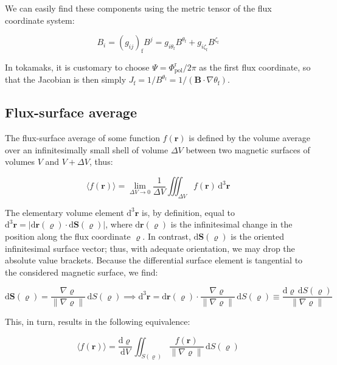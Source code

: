 We can easily find these components using the metric tensor of the flux coordinate system:

\begin{equation}
    B_i=(g_{ij})_\text{f}B^j=g_{i\theta_\text{f}}B^{\theta_\text{f}}+g_{i\zeta_\text{f}}B^{\zeta_\text{f}}
\end{equation}

In tokamaks, it is customary to choose $\Psi=\Phi_\text{pol}^\text{r}/2\pi$ as the first flux coordinate, so that the Jacobian is then simply $J_\text{f}=1/B^{\theta_\text{f}}=1/(\mathbf{B}\cdot\nabla\theta_\text{f})$.

\subsection{Flux-surface average}

The flux-surface average of some function $f(\mathbf{r})$ is defined by the volume average over an infinitesimally small shell of volume $\Delta V$ between two magnetic surfaces of volumes $V$ and $V+\Delta V$, thus:

\begin{equation}
    \label{eq-6-x-x}
    \langle f(\mathbf{r})\rangle=\lim_{\Delta V\to0}\frac{1}{\Delta V}\iiint_{\Delta V}f(\mathbf{r})\,\mathrm{d}^3\mathbf{r}
\end{equation}

The elementary volume element $\mathrm{d}^3\mathbf{r}$ is, by definition, equal to $\mathrm{d}^3\mathbf{r}=|\mathrm{d}\mathbf{r}(\varrho)\cdot\mathrm{d}\mathbf{S}(\varrho)|$, where $\mathrm{d}\mathbf{r}(\varrho)$ is the infinitesimal change in the position along the flux coordinate $\varrho$. In contrast, $\mathrm{d}\mathbf{S}(\varrho)$ is the oriented infinitesimal surface vector; thus, with adequate orientation, we may drop the absolute value brackets. Because the differential surface element is tangential to the considered magnetic surface, we find:

\begin{equation}
    \mathrm{d}\mathbf{S}(\varrho)=\frac{\nabla\varrho}{\|\nabla\varrho\|}\,\mathrm{d}S(\varrho)\implies\mathrm{d}^3\mathbf{r}=\mathrm{d}\mathbf{r}(\varrho)\cdot\frac{\nabla\varrho}{\|\nabla\varrho\|}\,\mathrm{d}S(\varrho)\equiv\frac{\mathrm{d}\varrho\,\mathrm{d}S(\varrho)}{\|\nabla\varrho\|}
\end{equation}

This, in turn, results in the following equivalence:

\begin{equation}
    \langle f(\mathbf{r})\rangle=\frac{\mathrm{d}\varrho}{\mathrm{d}V}\iint_{S(\varrho)}\frac{f(\mathbf{r})}{\|\nabla\varrho\|}\,\mathrm{d}S(\varrho)
\end{equation}

